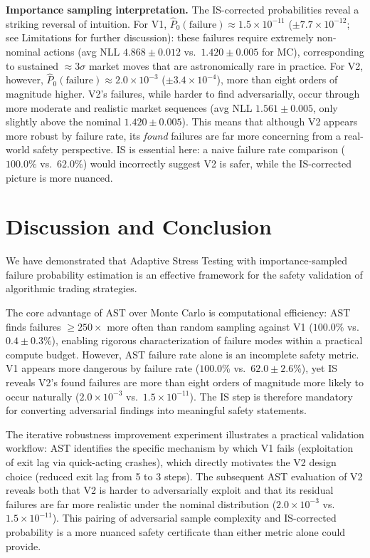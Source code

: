 \documentclass[conference]{IEEEtran}
\begin{document}
\textbf{Importance sampling interpretation.}
The IS-corrected probabilities reveal a striking reversal of intuition.
For V1, $\hat{P}_0(\text{failure}) \approx 1.5 \times 10^{-11}$
($\pm 7.7 \times 10^{-12}$; see Limitations for further discussion): these failures require extremely non-nominal
actions (avg NLL $4.868 \pm 0.012$ vs.\ $1.420 \pm 0.005$ for MC),
corresponding to sustained ${\approx}3\sigma$ market moves that are
astronomically rare in practice. For V2, however,
$\hat{P}_0(\text{failure}) \approx 2.0 \times 10^{-3}$
($\pm 3.4 \times 10^{-4}$), more than eight orders of magnitude higher.
V2's failures, while harder to find adversarially, occur through more
moderate and realistic market sequences (avg NLL $1.561 \pm 0.005$, only
slightly above the nominal $1.420 \pm 0.005$). This means that although V2
appears more robust by failure rate, its \emph{found} failures are far more
concerning from a real-world safety perspective. IS is essential here: a
naive failure rate comparison ($100.0\%$ vs.\ $62.0\%$) would incorrectly
suggest V2 is safer, while the IS-corrected picture is more nuanced.

\section{Discussion and Conclusion}

We have demonstrated that Adaptive Stress Testing with importance-sampled
failure probability estimation is an effective framework for the safety
validation of algorithmic trading strategies.

The core advantage of AST over Monte Carlo is computational efficiency:
AST finds failures $\geq\!250\times$ more often than random sampling against
V1 ($100.0\%$ vs.\ $0.4 \pm 0.3\%$), enabling rigorous characterization
of failure modes within a practical compute budget. However, AST failure
rate alone is an incomplete safety metric. V1 appears more dangerous by
failure rate ($100.0\%$ vs.\ $62.0 \pm 2.6\%$), yet IS reveals V2's found
failures are more than eight orders of magnitude more likely to occur
naturally ($2.0\!\times\!10^{-3}$ vs.\ $1.5\!\times\!10^{-11}$).
The IS step is therefore mandatory for converting
adversarial findings into meaningful safety statements.

The iterative robustness improvement experiment illustrates a practical validation
workflow: AST identifies the specific mechanism by which V1 fails
(exploitation of exit lag via quick-acting crashes), which directly
motivates the V2 design choice (reduced exit lag from 5 to 3 steps).
The subsequent AST evaluation of V2 reveals both that V2 is harder to
adversarially exploit and that its residual failures are far more
realistic under the nominal distribution
($2.0\!\times\!10^{-3}$ vs.\ $1.5\!\times\!10^{-11}$). This pairing
of adversarial sample complexity and IS-corrected probability is a more
nuanced safety certificate than either metric alone could provide.
\end{document}
